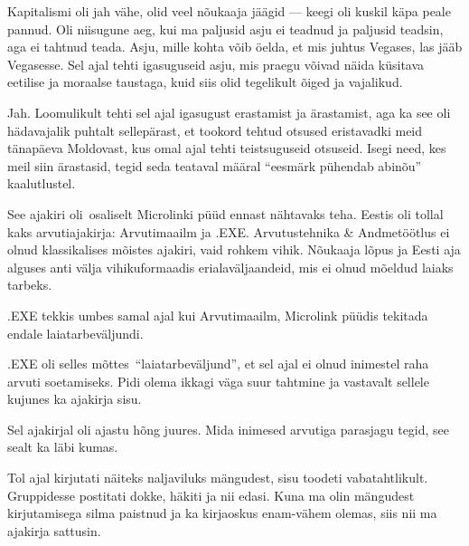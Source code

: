 
Kapitalismi oli jah vähe, olid veel nõukaaja jäägid --- keegi oli kuskil käpa peale 
pannud. Oli niisugune aeg, kui ma paljusid asju ei teadnud ja 
paljusid teadsin, aga ei tahtnud teada. Asju, mille kohta võib öelda, et mis juhtus Vegases, las jääb Vegasesse. Sel ajal tehti 
igasuguseid asju, mis praegu võivad näida küsitava 
eetilise ja moraalse taustaga, kuid siis olid 
tegelikult õiged ja vajalikud.


Jah. Loomulikult tehti sel ajal igasugust erastamist ja ärastamist, aga ka see oli 
hädavajalik puhtalt sellepärast, et tookord tehtud otsused eristavadki meid 
tänapäeva Moldovast, kus omal ajal tehti teistsuguseid otsuseid. Isegi 
need, kes meil siin ärastasid, tegid seda teataval määral 
\enquote{eesmärk pühendab abinõu} kaalutlustel.


See ajakiri oli osaliselt Microlinki püüd ennast nähtavaks 
teha. Eestis oli tollal kaks arvutiajakirja: 
Arvutimaailm ja .EXE. Arvutustehnika \& 
Andmetöötlus ei olnud klassikalises mõistes ajakiri, vaid rohkem 
vihik. Nõukaaja lõpus ja Eesti aja alguses anti välja vihikuformaadis 
erialaväljaandeid, mis ei olnud mõeldud laiaks tarbeks.

.EXE tekkis umbes samal ajal kui Arvutimaailm, Microlink 
püüdis tekitada endale laiatarbeväljundi.


.EXE oli selles mõttes \enquote{laiatarbeväljund}, et sel ajal ei olnud inimestel 
raha arvuti soetamiseks. Pidi olema ikkagi väga suur tahtmine ja vastavalt sellele kujunes ka ajakirja sisu. 

Sel ajakirjal oli ajastu hõng juures. Mida inimesed arvutiga parasjagu tegid, 
see sealt ka läbi kumas. 


Tol ajal kirjutati näiteks naljaviluks mängudest, sisu toodeti vabatahtlikult. 
Gruppidesse postitati dokke, häkiti ja nii edasi. Kuna ma olin mängudest kirjutamisega silma 
paistnud ja ka kirjaoskus enam-vähem olemas, siis nii ma ajakirja sattusin. 


